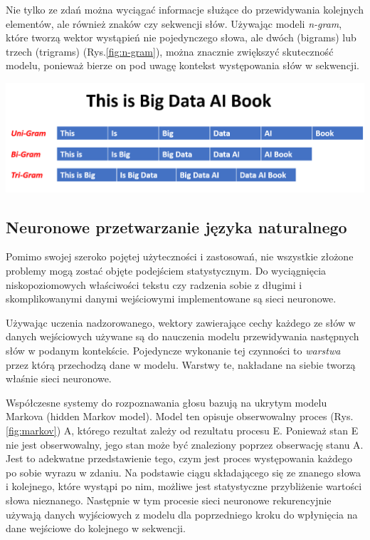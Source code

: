 Nie tylko ze zdań można wyciągać informacje służące do przewidywania kolejnych elementów, ale również znaków czy sekwencji słów. Używając modeli \textit{n-gram}, które tworzą wektor wystąpień nie pojedynczego słowa, ale dwóch (bigrams) lub trzech (trigrams) (Rys.\ref{fig:n-gram}), można znacznie zwiększyć skuteczność modelu, ponieważ bierze on pod uwagę kontekst występowania słów w sekwencji. 

\begin{center}
    \includegraphics[width=0.8\linewidth]{files/n-grams.png}
    \label{fig:n-gram}
\end{center}


\subsection{Neuronowe przetwarzanie języka naturalnego}
\label{subsec:neural}

Pomimo swojej szeroko pojętej użyteczności i zastosowań, nie wszystkie złożone problemy mogą zostać objęte podejściem statystycznym. Do wyciągnięcia niskopoziomowych właściwości tekstu czy radzenia sobie z długimi i skomplikowanymi danymi wejściowymi implementowane są sieci neuronowe. 

Używając uczenia nadzorowanego, wektory zawierające cechy każdego ze słów w danych wejściowych używane są do nauczenia modelu przewidywania następnych słów w podanym kontekście. Pojedyncze wykonanie tej czynności to \textit{warstwa} przez którą przechodzą dane w modelu. Warstwy te, nakładane na siebie tworzą właśnie sieci neuronowe. 

Współczesne systemy do rozpoznawania głosu bazują na ukrytym modelu Markova (hidden Markov model). Model ten opisuje obserwowalny proces (Rys. \ref{fig:markov}) A, którego rezultat zależy od rezultatu procesu E. Ponieważ stan E nie jest obserwowalny, jego stan może być znaleziony poprzez obserwację stanu A. Jest to adekwatne przedstawienie tego, czym jest proces występowania każdego po sobie wyrazu w zdaniu. Na podstawie ciągu składającego się ze znanego słowa i kolejnego, które wystąpi po nim, możliwe jest statystyczne przybliżenie wartości słowa nieznanego. Następnie w tym procesie sieci neuronowe rekurencyjnie używają danych wyjściowych z modelu dla poprzedniego kroku do wpłynięcia na dane wejściowe do kolejnego w sekwencji. 

